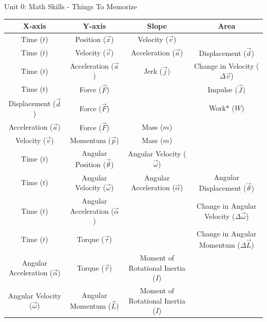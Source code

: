 \documentclass[letterpaper,landscape, 12pt]{article}
\newcommand{\assnum}{Unit 0: Math Skills}
\newcommand{\assname}{Things To Memorize}
\begin{document}
\fancyfoot[r]{\assnum}	


\begin{center} \assnum{} - \assname{}
\end{center}


 \begin{tabular}{|c|c|c|c|}
	\hline
	\textbf{X-axis} & \textbf{Y-axis} & \textbf{Slope} & \textbf{Area} \\
	\hline
	Time ($t$) & Position ($\vec{x}$) & Velocity ($\vec{v}$)& \\
	\hline
	Time ($t$) & Velocity ($\vec{v}$) & Acceleration ($\vec{a}$) & Displacement ($\vec{d}$) \\
	\hline
	Time ($t$) & Acceleration ($\vec{a}$)& Jerk ($\vec{j}$)& Change in Velocity ($\Delta\vec{v}$)\\
	\hline
	Time ($t$) & Force ($\vec{F}$) & & Impulse ($\vec{J}$) \\
	\hline
	Displacement ($\vec{d}$) & Force ($\vec{F}$) & & Work* ($W$)\\
	\hline
	Acceleration ($\vec{a}$) & Force ($\vec{F}$) & Mass ($m$) & \\
	\hline
	Velocity ($\vec{v}$) & Momentum ($\vec{p}$) & Mass ($m$) & \\
	\hline
	
	Time  ($t$) & Angular Position ($\vec{\theta}$)& Angular Velocity ($\vec{\omega}$)& \\
	\hline
	Time ($t$) &Angular Velocity ($\vec{\omega}$) & Angular Acceleration ($\vec{\alpha}$) & Angular Displacement ($\vec{\theta}$)\\
	\hline
	Time ($t$) & Angular Acceleration ($\vec{\alpha}$) &  & Change in Angular Velocity ($\Delta\vec{\omega}$) \\
	\hline
	Time ($t$) & Torque ($\vec{\tau}$)& & Change in Angular Momentum ($\Delta\vec{L}$) \\
	\hline
	Angular Acceleration ($\vec{\alpha}$) & Torque ($\vec{\tau}$) & Moment of Rotational Inertia ($I$) & \\
	\hline
	Angular Velocity ($\vec{\omega}$) & Angular Momentum ($\vec{L}$)&  Moment of Rotational Inertia ($I$) & \\
	\hline
	
	
	
	
\end{tabular}

 
\end{document}
